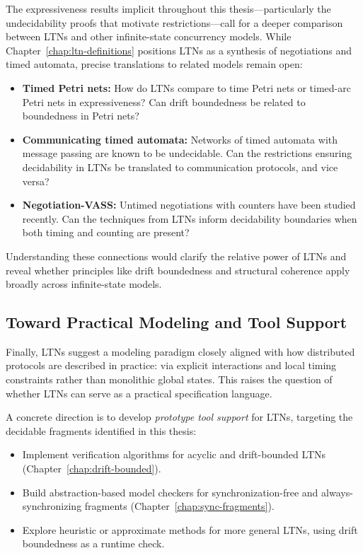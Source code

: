 The expressiveness results implicit throughout this thesis—particularly the undecidability proofs that motivate restrictions—call for a deeper comparison between LTNs and other infinite-state concurrency models. While Chapter~\ref{chap:ltn-definitions} positions LTNs as a synthesis of negotiations and timed automata, precise translations to related models remain open:
\begin{itemize}
\item \textbf{Timed Petri nets:} How do LTNs compare to time Petri nets or timed-arc Petri nets in expressiveness? Can drift boundedness be related to boundedness in Petri nets?
\item \textbf{Communicating timed automata:} Networks of timed automata with message passing are known to be undecidable. Can the restrictions ensuring decidability in LTNs be translated to communication protocols, and vice versa?
\item \textbf{Negotiation-VASS:} Untimed negotiations with counters have been studied recently. Can the techniques from LTNs inform decidability boundaries when both timing and counting are present?
\end{itemize}

Understanding these connections would clarify the relative power of LTNs and reveal whether principles like drift boundedness and structural coherence apply broadly across infinite-state models.

\subsection{Toward Practical Modeling and Tool Support}

Finally, LTNs suggest a modeling paradigm closely aligned with how distributed protocols are described in practice: via explicit interactions and local timing constraints rather than monolithic global states. This raises the question of whether LTNs can serve as a practical specification language.

A concrete direction is to develop \emph{prototype tool support} for LTNs, targeting the decidable fragments identified in this thesis:
\begin{itemize}
\item Implement verification algorithms for acyclic and drift-bounded LTNs (Chapter~\ref{chap:drift-bounded}).
\item Build abstraction-based model checkers for synchronization-free and always-synchronizing fragments (Chapter~\ref{chap:sync-fragments}).
\item Explore heuristic or approximate methods for more general LTNs, using drift boundedness as a runtime check.
\end{itemize}

